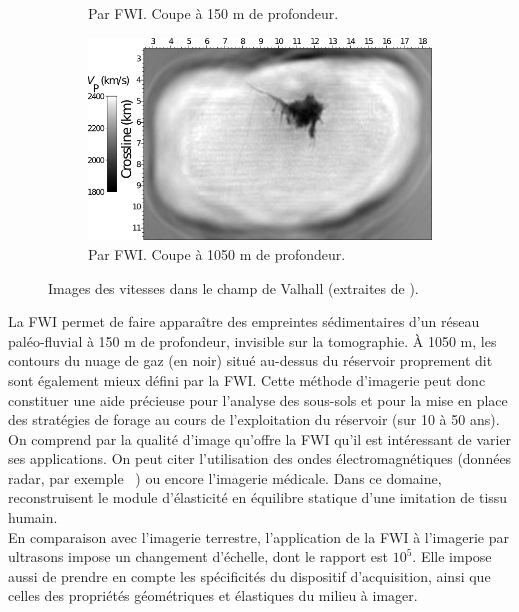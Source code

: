 \begin{figure}[!h]
\begin{subfigure}[b]{0.4\textwidth}
        \caption{Par FWI. Coupe à 150 m de profondeur.}
        \label{}
    \end{subfigure}
    \hspace{0.5cm}
    \begin{subfigure}[b]{0.4\textwidth}
        \includegraphics[width=\textwidth]{img/geophy4.png}
        \caption{Par FWI. Coupe à 1050 m de profondeur.}
        \label{}
    \end{subfigure}
    \caption{Images des vitesses dans le champ de Valhall (extraites de \cite{sirgue_valhall}).\label{valhall}}
\end{figure} 
   
La FWI permet de faire apparaître des empreintes sédimentaires d'un réseau paléo-fluvial à 150 m de profondeur, invisible sur la tomographie. À 1050 m, les contours du nuage de gaz (en noir) situé au-dessus du réservoir proprement dit sont également mieux défini par la FWI. Cette méthode d'imagerie peut donc constituer une aide précieuse pour l'analyse des sous-sols et pour la mise en place des stratégies de forage au cours de l'exploitation du réservoir (sur 10 à 50 ans).\\

On comprend par la qualité d'image qu'offre la FWI qu'il est intéressant de varier ses applications. On peut citer l'utilisation des ondes électromagnétiques (données radar, par exemple ~\cite{lopes}) ou encore l'imagerie médicale. Dans ce domaine, \cite{oberai_03,oberai_04} reconstruisent le module d'élasticité en équilibre statique d'une imitation de tissu humain.\\

En comparaison avec l'imagerie terrestre, l'application de la FWI à l'imagerie par ultrasons impose un changement d'échelle, dont le rapport est $10^5$. Elle impose aussi de prendre en compte les spécificités du dispositif d'acquisition, ainsi que celles des propriétés géométriques et élastiques du milieu à imager.







